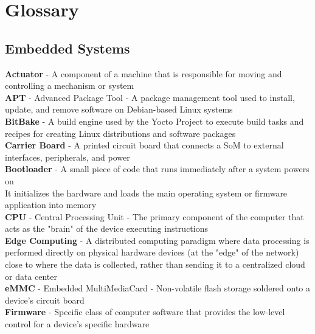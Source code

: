\label{sec:glossary}

\chapter{Glossary}\label{glossary}

\section{Embedded Systems}\label{embedded-systems}

\begingroup
\setlength{\parindent}{0pt}
\begin{singlespace}
\textbf{Actuator} - A component of a machine that is responsible for moving
and controlling a mechanism or system  \\

\textbf{APT} - Advanced Package Tool - A package management tool used to
install, update, and remove software on Debian-based Linux systems  \\

\textbf{BitBake} - A build engine used by the Yocto Project to execute
build tasks and recipes for creating Linux distributions and software
packages  \\

\textbf{Carrier Board} - A printed circuit board that connects a SoM to
external interfaces, peripherals, and power  \\

\textbf{Bootloader} - A small piece of code that runs immediately after a
system powers on  \\ It initializes the hardware and loads the main
operating system or firmware application into memory  \\

\textbf{CPU} - Central Processing Unit - The primary component of the
computer that acts as the "brain" of the device executing instructions  \\

\textbf{Edge Computing} - A distributed computing paradigm where data
processing is performed directly on physical hardware devices (at the
"edge" of the network) close to where the data is collected, rather than
sending it to a centralized cloud or data center  \\

\textbf{eMMC} - Embedded MultiMediaCard - Non-volatile flash storage
soldered onto a device's circuit board  \\

\textbf{Firmware} - Specific class of computer software that provides the
low-level control for a device's specific hardware  \\


\end{singlespace}
